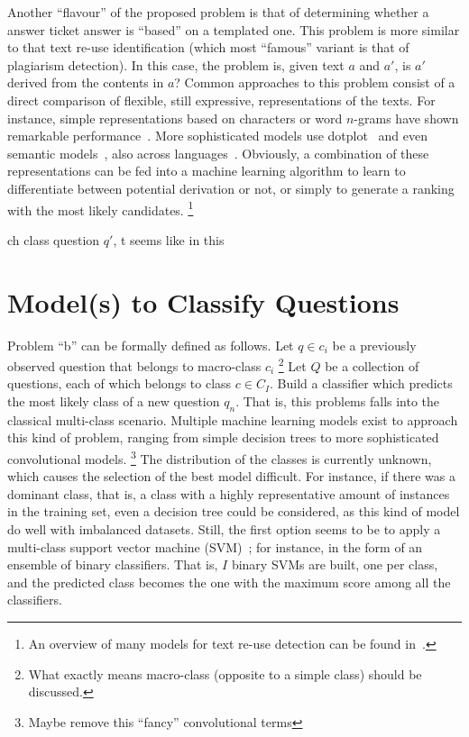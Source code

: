 \documentclass{sig-alternate-05-2015}
\begin{document}
Another ``flavour'' of the proposed problem is that of determining whether a 
answer ticket answer is ``based'' on a templated one. This problem is more 
similar to that text re-use identification (which most ``famous'' variant is 
that of plagiarism detection). In this case, the problem is, given text $a$ and 
$a'$, is $a'$ derived from the contents in $a$? Common approaches to this 
problem consist of a direct comparison of flexible, still expressive, 
representations of the texts. For instance, simple representations based on 
characters or word $n$-grams have shown remarkable performance~\cite{Lyon:04}. 
More sophisticated models use dotplot~\cite{Basile:2009} and even semantic 
models~\cite{Gabrilovich:07}, also across languages~\cite{Potthast:11}. 
Obviously, a combination of these representations can be fed into a machine 
learning algorithm to learn  to differentiate between potential derivation or 
not, or simply to generate a ranking with the most likely candidates.%
\footnote{An overview of many models for text re-use detection can be found 
in~\cite{BarronPhd:12}.}

ch class question $q'$, t seems like 
in this 


\section{Model(s) to Classify Questions}
Problem ``b'' can be formally defined as follows. Let $q\in c_i$ be a previously 
observed question that belongs to macro-class $c_i$%
\footnote{What exactly means macro-class (opposite to a simple class) should be 
discussed.}
Let $Q$ be a collection of questions, each of which belongs to class $c\in C_I$. 
Build a classifier which predicts the most likely class of a new question $q_n$. 
That is, this problems falls into the classical multi-class scenario. Multiple 
machine learning models exist to approach this kind of problem, ranging from 
simple decision trees to more sophisticated convolutional models.%
\footnote{Maybe remove this ``fancy'' convolutional terms}
The distribution of the classes is currently unknown, which causes the selection 
of the best model difficult. For instance, if there was a dominant class, that 
is, a class with a highly representative amount of instances in the training 
set, even a decision tree could be considered, as this kind of model do well 
with imbalanced datasets. Still, the first option seems to be to apply a 
multi-class support vector machine (SVM)~\cite{Joachims:99}; for 
instance, in the form of an ensemble of binary classifiers. That is, $I$ binary 
SVMs are built, one per class, and the predicted class becomes the one with the 
maximum score among all the classifiers. 
\end{document}
